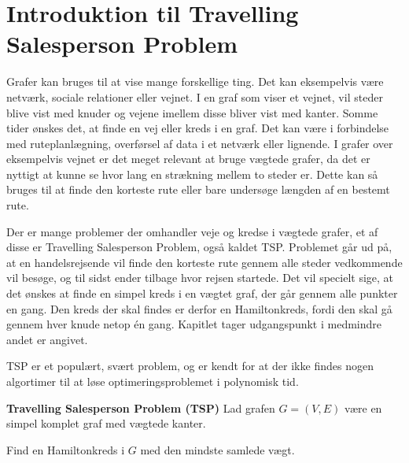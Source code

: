 \section{Introduktion til Travelling Salesperson Problem}
Grafer kan bruges til at vise mange forskellige ting. 
Det kan eksempelvis være netværk, sociale relationer eller vejnet. 
I en graf som viser et vejnet, vil steder blive vist med knuder og vejene imellem disse bliver vist med kanter.
Somme tider ønskes det, at finde en vej eller kreds i en graf.
Det kan være i forbindelse med ruteplanlægning, overførsel af data i et netværk eller lignende. 
I grafer over eksempelvis vejnet er det meget relevant at bruge vægtede grafer, da det er nyttigt at kunne se hvor lang en strækning mellem to steder er.
Dette kan så bruges til at finde den korteste rute eller bare undersøge længden af en bestemt rute. 

Der er mange problemer der omhandler veje og kredse i vægtede grafer, et af disse er Travelling Salesperson Problem, også kaldet TSP.
Problemet går ud på, at en handelsrejsende vil finde den korteste rute gennem alle steder vedkommende vil besøge, og til sidst ender tilbage hvor rejsen startede.
Det vil specielt sige, at det ønskes at finde en simpel kreds i en vægtet graf, der går gennem alle punkter en gang. 
Den kreds der skal findes er derfor en Hamiltonkreds, fordi den skal gå gennem hver knude netop én gang. Kapitlet tager udgangspunkt i \citep{metrictsp} medmindre andet er angivet.

TSP er et populært, svært problem, og er kendt for at der ikke findes nogen algortimer til at løse optimeringsproblemet i polynomisk tid. 

\begin{tcolorbox}
	\textbf{Travelling Salesperson Problem (TSP)} \quad Lad grafen $G=(V,E)$ være en simpel komplet graf med vægtede kanter.

	Find en Hamiltonkreds i $G$ med den mindste samlede vægt.
\end{tcolorbox}